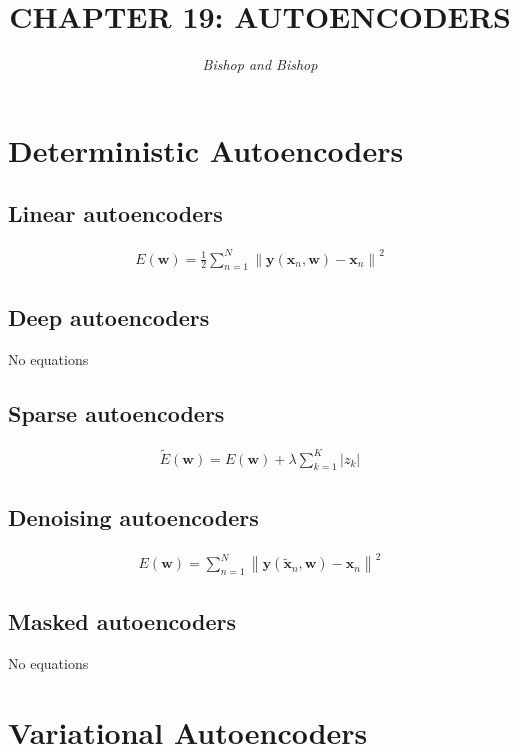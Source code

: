 \documentclass{article}
\title{\LARGE\scshape\MakeUppercase{Chapter 19: Autoencoders}}
\author{\textit{Bishop and Bishop}}
\date{}
\begin{document}
\maketitle

\section{Deterministic Autoencoders}

\subsection{Linear autoencoders}
\begin{align*}
E(\mathbf{w})=\frac{1}{2} \sum_{n=1}^{N}\left\|\mathbf{y}\left(\mathbf{x}_{n}, \mathbf{w}\right)-\mathbf{x}_{n}\right\|^{2} 
\tag{19.1}
\end{align*}

\subsection{Deep autoencoders}
No equations

\subsection{Sparse autoencoders}

\begin{align*}
\widetilde{E}(\mathbf{w})=E(\mathbf{w})+\lambda \sum_{k=1}^{K}\left|z_{k}\right| 
\tag{19.2}
\end{align*}

\subsection{Denoising autoencoders}

\begin{align*}
E(\mathbf{w})=\sum_{n=1}^{N}\left\|\mathbf{y}\left(\widetilde{\mathbf{x}}_{n}, \mathbf{w}\right)-\mathbf{x}_{n}\right\|^{2} 
\tag{19.3}
\end{align*}

\subsection{Masked autoencoders}

No equations

\section{Variational Autoencoders}
\end{document}
